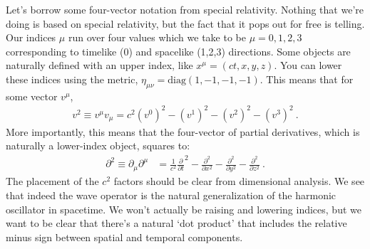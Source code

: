 Let's borrow some four-vector notation from special relativity. Nothing that we're doing is based on special relativity, but the fact that it pops out for free is telling. Our indices $\mu$ run over four values which we take to be $\mu = 0,1,2,3$ corresponding to timelike (0) and spacelike (1,2,3) directions. Some objects are naturally defined with an upper index, like $x^\mu = (ct,x,y,z)$. You can lower these indices using the metric, $\eta_{\mu\nu}=\text{diag}(1,-1,-1,-1)$. This means that for some vector $v^\mu$,
\begin{align}
 	v^2 \equiv v^\mu v_\mu 
 	= c^2(v^0)^2 - (v^1)^2 - (v^2)^2 - (v^3)^2 \ .
 \end{align}
 More importantly, this means that the four-vector of partial derivatives, which is naturally a lower-index object, squares to:
 \begin{align}
	 \partial^2\equiv
 	\partial_\mu \partial^\mu 
 	&= 
 	\frac{1}{c^2}
			\frac{\partial}{\partial t}^2
			-
			\frac{\partial^2}
			{\partial x^2}
			-
			\frac{\partial^2}
			{\partial y^2}
			-
			\frac{\partial^2}
			{\partial z^2} \ .
 \end{align}
The placement of the $c^2$ factors should be clear from dimensional analysis. We see that indeed the wave operator is the natural generalization of the harmonic oscillator in spacetime. We won't actually be raising and lowering indices, but we want to be clear that there's a natural `dot product' that includes the relative minus sign between spatial and temporal components.

